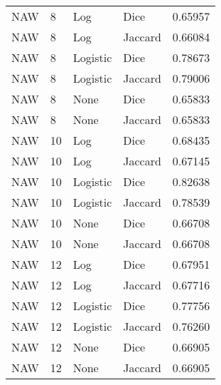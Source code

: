 \documentclass{article}
\begin{document}
   \begin{center}
      \scriptsize
      
      \tablelasttail{\hline}

         \begin{supertabular}{| l | l | l | l | l |}
               NAW & 8 & Log & Dice & 0.65957 \\
               NAW & 8 & Log & Jaccard & 0.66084 \\
               NAW & 8 & Logistic & Dice & 0.78673 \\
               NAW & 8 & Logistic & Jaccard & 0.79006 \\
               NAW & 8 & None & Dice & 0.65833 \\
               NAW & 8 & None & Jaccard & 0.65833 \\
               NAW & 10 & Log & Dice & 0.68435 \\
               NAW & 10 & Log & Jaccard & 0.67145 \\
               NAW & 10 & Logistic & Dice & 0.82638 \\
               NAW & 10 & Logistic & Jaccard & 0.78539 \\
               NAW & 10 & None & Dice & 0.66708 \\
               NAW & 10 & None & Jaccard & 0.66708 \\
               NAW & 12 & Log & Dice & 0.67951 \\
               NAW & 12 & Log & Jaccard & 0.67716 \\
               NAW & 12 & Logistic & Dice & 0.77756 \\
               NAW & 12 & Logistic & Jaccard & 0.76260 \\
               NAW & 12 & None & Dice & 0.66905 \\
               NAW & 12 & None & Jaccard & 0.66905 \\

\end{supertabular}
\end{center}
\end{document}
